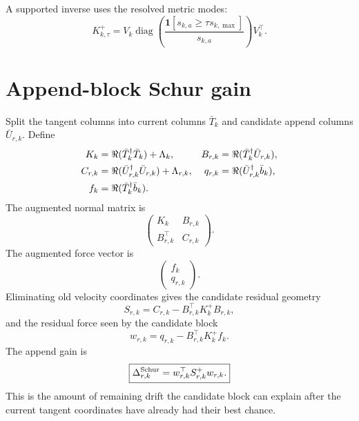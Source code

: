 \documentclass[10pt,twocolumn]{article}
\newcommand{\diag}{\operatorname{diag}}
\begin{document}
A supported inverse uses the resolved metric modes:
\begin{equation}
K_{k,\tau}^+
=V_k\diag\left(\frac{\mathbf 1[s_{k,a}\ge\tau s_{k,\max}]}{s_{k,a}}\right)V_k^\top.
\label{eq:p2_supported_inverse}
\end{equation}

\section{Append-block Schur gain}

Split the tangent columns into current columns \(\bar T_k\) and candidate append columns \(\bar U_{r,k}\). Define
\begin{align}
K_k&=\Re(\bar T_k^\dagger\bar T_k)+\Lambda_k,
&
B_{r,k}&=\Re(\bar T_k^\dagger\bar U_{r,k}),
\notag\\
C_{r,k}&=\Re(\bar U_{r,k}^\dagger\bar U_{r,k})+\Lambda_{r,k},
&
q_{r,k}&=\Re(\bar U_{r,k}^\dagger\bar b_k),
\notag\\
f_k&=\Re(\bar T_k^\dagger\bar b_k).
\label{eq:p2_append_blocks}
\end{align}
The augmented normal matrix is
\begin{equation}
\begin{pmatrix}
K_k&B_{r,k}\\
B_{r,k}^\top&C_{r,k}
\end{pmatrix}.
\label{eq:p2_augmented_normal}
\end{equation}
The augmented force vector is
\begin{equation}
\begin{pmatrix}
f_k\\ q_{r,k}
\end{pmatrix}.
\label{eq:p2_augmented_force}
\end{equation}
Eliminating old velocity coordinates gives the candidate residual geometry
\begin{equation}
S_{r,k}=C_{r,k}-B_{r,k}^\top K_k^+B_{r,k},
\label{eq:p2_append_schur}
\end{equation}
and the residual force seen by the candidate block
\begin{equation}
w_{r,k}=q_{r,k}-B_{r,k}^\top K_k^+f_k.
\label{eq:p2_residual_force}
\end{equation}
The append gain is
\begin{equation}
\boxed{
\Delta_{r,k}^{\rm Schur}=w_{r,k}^\top S_{r,k}^+w_{r,k}.
}
\label{eq:p2_append_gain}
\end{equation}
This is the amount of remaining drift the candidate block can explain after the current tangent coordinates have already had their best chance.
\end{document}
